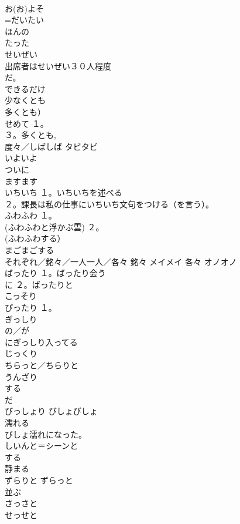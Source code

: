 \documentclass[8pt]{extreport}
\begin{document}
\begin{CJK}{UTF8}{min}
\\	お(お)よそ	
\\	=だいたい
\\	ほんの	
\\	たった	
\\	せいぜい	
\\	出席者はせいぜい３０人程度
\\	だ。 
\\	できるだけ
\\	少なくとも	
\\	多くとも）
\\	せめて	１。
\\	３。多くとも, 
\\	度々／しばしば	タビタビ 
\\	いよいよ	
\\	ついに 
\\	ますます 
\\	いちいち	１。いちいちを述べる 
\\	２。課長は私の仕事にいちいち文句をつける（を言う）。 
\\	ふわふわ	１。
\\	(ふわふわと浮かぶ雲) ２。
\\	(ふわふわする）
\\	まごまごする	
\\	それぞれ／銘々／一人一人／各々	銘々 メイメイ 各々 オノオノ 
\\	ばったり	１。ばったり会う 
\\	に ２。ばったりと 
\\	こっそり	
\\	ぴったり	１。
\\	ぎっしり	
\\	の／が 
\\	にぎっしり入ってる 
\\	じっくり 
\\	ちらっと／ちらりと	
\\	うんざり	
\\	する 
\\	だ 
\\	びっしょり びしょびしょ	
\\	濡れる 
\\	びしょ濡れになった。
\\	しいんと＝シーンと	
\\	する 
\\	静まる
\\	ずらりと ずらっと	
\\	並ぶ
\\	さっさと	
\\	せっせと	

\end{CJK}
\end{document}
